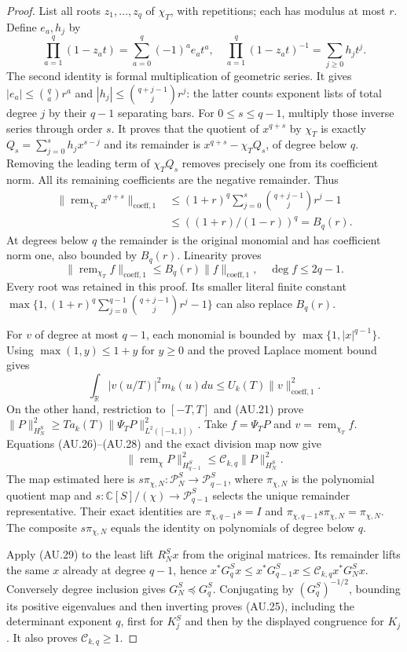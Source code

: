 \documentclass[11pt]{article}
\newcommand{\C}{\mathbb C}
\newcommand{\R}{\mathbb R}
\begin{document}
\begin{proof}
List all roots $z_1,\ldots,z_q$ of $\chi_T$, with repetitions;
each has modulus at most $r$. Define $e_a,h_j$ by
\[
 \prod_{a=1}^q(1-z_at)=\sum_{a=0}^q(-1)^ae_at^a,
 \quad
 \prod_{a=1}^q(1-z_at)^{-1}=\sum_{j\ge0}h_jt^j.
\]
The second identity is formal multiplication of geometric series.
It gives $|e_a|\le\binom qa r^a$ and
$|h_j|\le\binom{q+j-1}{j}r^j$: the latter counts exponent lists
of total degree $j$ by their $q-1$ separating bars.
For $0\le s\le q-1$, multiply those inverse series through order $s$.
It proves that the quotient of $x^{q+s}$ by $\chi_T$ is exactly
$Q_s=\sum_{j=0}^sh_jx^{s-j}$ and its remainder is
$x^{q+s}-\chi_TQ_s$, of degree below $q$.
Removing the leading term of $\chi_TQ_s$ removes precisely one
from its coefficient norm. All its remaining coefficients are the
negative remainder. Thus
\[
 \begin{split}
 \|\operatorname{rem}_{\chi_T}x^{q+s}\|_{\mathrm{coeff},1}
 &\le(1+r)^q\sum_{j=0}^s\binom{q+j-1}{j}r^j-1\\
 &\le((1+r)/(1-r))^q=B_q(r).
 \end{split}
\]
At degrees below $q$ the remainder is the original monomial and has
coefficient norm one, also bounded by $B_q(r)$. Linearity proves
\[
 \|\operatorname{rem}_{\chi_T}f\|_{\mathrm{coeff},1}
 \le B_q(r)\|f\|_{\mathrm{coeff},1},\quad\deg f\le2q-1.
 \tag{AU.27}
\]
Every root was retained in this proof. Its smaller literal finite
constant $\max\{1,(1+r)^q\sum_{j=0}^{q-1}\binom{q+j-1}{j}r^j-1\}$
can also replace $B_q(r)$.

For $v$ of degree at most $q-1$, each monomial is bounded by
$\max\{1,|x|^{q-1}\}$. Using $\max(1,y)\le1+y$ for $y\ge0$
and the proved Laplace moment bound gives
\[
 \int_\R|v(u/T)|^2m_k(u)du
             \le U_k(T)\|v\|_{\mathrm{coeff},1}^2.        \tag{AU.28}
\]
On the other hand, restriction to $[-T,T]$ and (AU.21) prove
$\|P\|_{H_N^S}^2\ge T a_k(T)\|\Psi_TP\|_{L^2([-1,1])}^2$.
Take $f=\Psi_TP$ and $v=\operatorname{rem}_{\chi_T}f$.
Equations (AU.26)--(AU.28) and the exact division map now give
\[
 \|\operatorname{rem}_\chi P\|_{H_{q-1}^S}^2
                      \le\mathcal C_{k,q}\|P\|_{H_N^S}^2.
 \tag{AU.29}
\]
The map estimated here is $s\pi_{\chi,N}:\mathcal P_N^S\to
\mathcal P_{q-1}^S$, where $\pi_{\chi,N}$ is the polynomial quotient
map and $s:\C[S]/(\chi)\to\mathcal P_{q-1}^S$ selects the unique
remainder representative. Their exact identities are
$\pi_{\chi,q-1}s=I$ and
$\pi_{\chi,q-1}s\pi_{\chi,N}=\pi_{\chi,N}$.
The composite $s\pi_{\chi,N}$ equals the identity on polynomials
of degree below $q$.

Apply (AU.29) to the least lift $R_N^Sx$ from the original matrices.
Its remainder lifts the same
$x$ already at degree $q-1$, hence
$x^*G_q^Sx\le x^*G_{q-1}^Sx
\le\mathcal C_{k,q}x^*G_N^Sx$. Conversely degree inclusion gives
$G_N^S\preceq G_q^S$. Conjugating by $(G_q^S)^{-1/2}$, bounding its positive
eigenvalues and then inverting proves (AU.25), including the
determinant exponent $q$, first for $K_j^S$ and then by the displayed
congruence for $K_j$. It also proves $\mathcal C_{k,q}\ge1$.
\end{proof}
\end{document}

